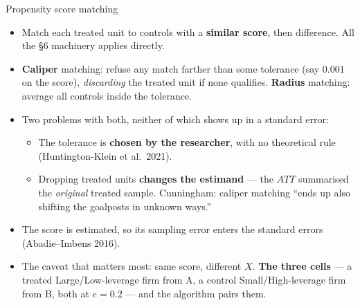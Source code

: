 \documentclass[
  11pt,
  ignorenonframetext,
  aspectratio=169,
]{beamer}
\newcounter{none} %
\providecommand{\tightlist}{%
  \setlength{\itemsep}{0pt}\setlength{\parskip}{0pt}}
\begin{document}
\begin{frame}{Propensity score matching}
\protect{}\label{propensity-score-matching}
\begin{itemize}
\tightlist
\item
  Match each treated unit to controls with a \textbf{similar score},
  then difference. All the §6 machinery applies directly.
\item
  \textbf{Caliper} matching: refuse any match farther than some
  tolerance (say \(0.001\) on the score), \emph{discarding} the treated
  unit if none qualifies. \textbf{Radius} matching: average all controls
  inside the tolerance.
\item
  Two problems with both, neither of which shows up in a standard error:

  \begin{itemize}
  \tightlist
  \item
    The tolerance is \textbf{chosen by the researcher}, with no
    theoretical rule (Huntington-Klein et al.~2021).
  \item
    Dropping treated units \textbf{changes the estimand} --- the \(ATT\)
    summarised the \emph{original} treated sample. Cunningham: caliper
    matching ``ends up also shifting the goalposts in unknown ways.''
  \end{itemize}
\item
  The score is estimated, so its sampling error enters the standard
  errors (Abadie--Imbens 2016).
\item
  The caveat that matters most: same score, different \(X\). \textbf{The
  three cells} --- a treated Large/Low-leverage firm from A, a control
  Small/High-leverage firm from B, both at \(e = 0.2\) --- and the
  algorithm pairs them.
\end{itemize}
\end{frame}
\end{document}
